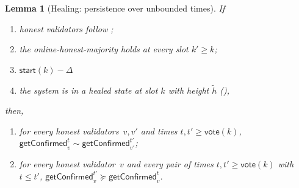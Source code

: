 \ifx\litemode\undefined\documentclass{article}\fi
\newcommand{\start}{\ensuremath{\mathsf{start}}}
\newcommand{\vote}{\ensuremath{\mathsf{vote}}}
\newcommand{\comm}[1]{\ensuremath{\widetilde{#1}}}
\newcommand{\getConfirmed}{\textsf{getConfirmed}\xspace}
\theoremstyle{plain}
\newtheorem{lemma}{Lemma}
\theoremstyle{definition}
\theoremstyle{remark}
\begin{document}
\begin{lemma}[Healing: persistence over unbounded times]\label{rev:lem:healing-unbounded}
If
\begin{enumerate}
  \item\label{rev:hu:f} honest validators follow ;
  \item\label{rev:hu:ohm} the online-honest-majority holds at every slot $k' \geq k$;
  \item\label{rev:hu:sync} $\start(k) - \Delta$
  \item\label{rev:hu:hs} the system is in a healed state at slot $k$ with height $\comm{h}$ (),
\end{enumerate}
then,
\begin{enumerate}
  \item for every honest validators~$v,v'$ and times $t, t' \geq \vote(k)$, $\getConfirmed_v^{t} \sim \getConfirmed_{v'}^{t'}$;
  \item for every honest validator~$v$ and every pair of times $t, t' \geq \vote(k)$ with $t \leq t'$, $\getConfirmed_v^{t'} \succeq \getConfirmed_v^t$.
\end{enumerate}
\end{lemma}
\end{document}
